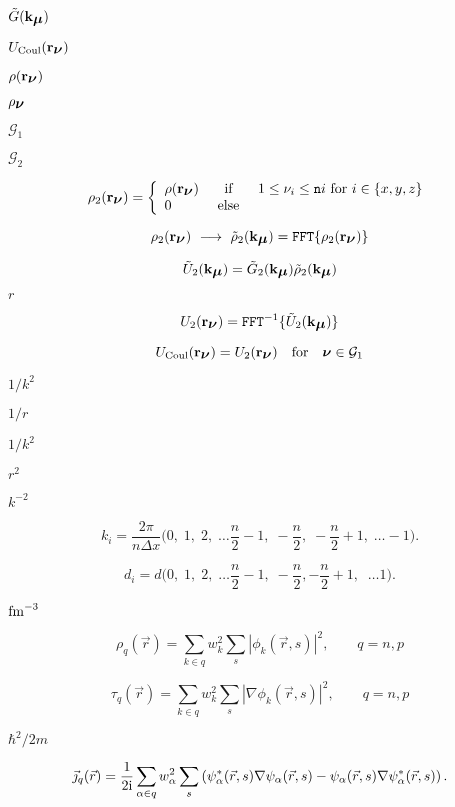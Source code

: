 \documentclass{article}
\begin{document}
$ \tilde{G}(\mathbf{k}_{\mbox{\boldmath$\mu$}}) $
\pagebreak

$ U_\mathrm{Coul}(\mathbf{r}_{\mbox{\boldmath$\nu$}}) $
\pagebreak

$\rho(\mathbf{r}_{\mbox{\boldmath$\nu$}})$
\pagebreak

$ \rho_{\mbox{\boldmath$\nu$}} $
\pagebreak

$ \mathcal{G}_1 $
\pagebreak

$ \mathcal{G}_2 $
\pagebreak

\[ \rho_2(\mathbf{r}_{\mbox{\boldmath$\nu$}}) = \left\{\begin{array}{lcl} \rho(\mathbf{r}_{\mbox{\boldmath$\nu$}}) &\mbox{ if }& 1\leq \nu_i \leq {\tt n}i \mbox{ for } i\in\{x,y,z\}\\ 0 &\mbox{ else }\end{array}\right. \]
\pagebreak

\[ \rho_2(\mathbf{r}_{\bnu})\ \longrightarrow\ \tilde{\rho}_2(\mathbf{k}_{\bmu})={\tt FFT}\{\rho_2(\mathbf{r}_{\bnu})\} \]
\pagebreak

\[ \tilde{U}_2(\mathbf{k}_{\mbox{\boldmath$\mu$}}) =\tilde{G}_2(\mathbf{k}_{\mbox{\boldmath$\mu$}})\tilde{\rho}_2(\mathbf{k}_{\mbox{\boldmath$\mu$}}) \]
\pagebreak

$ r $
\pagebreak

\[ {U}_2(\mathbf{r}_{\mbox{\boldmath$\nu$}})={\tt FFT}^{-1}\{\tilde{U}_2(\mathbf{k}_{\mbox{\boldmath$\mu$}})\} \]
\pagebreak

\[ {U}_\mathrm{Coul}(\mathbf{r}_{\mbox{\boldmath$\nu$}})=U_2(\mathbf{r}_{\mbox{\boldmath$\nu$}})\quad\mbox{for}\quad\mbox{\boldmath$\nu$}\in\mathcal{G}_1 \]
\pagebreak

$1/k^2$
\pagebreak

$1/r$
\pagebreak

$ 1/k^2 $
\pagebreak

$r^2$
\pagebreak

$k^{-2}$
\pagebreak

\[ k_i=\frac{2\pi}{n\Delta x}\bigl(0,\;1,\;2,\;\ldots \frac{n}2-1,\; -\frac{n}2,\;-\frac{n}2+1,\;\ldots -1\bigr).\]
\pagebreak

\[ d_i=d\bigl(0,\;1,\;2,\;\ldots \frac{n}2-1,\; -\frac{n}2,-\frac{n}2+1,\;\;\ldots 1\bigr).\]
\pagebreak

${\rm fm}^{-3} $
\pagebreak

\[ \rho_q(\vec r)=\sum_{k\in q}w_k^2\sum_s|\phi_k(\vec r,s)|^2,\qquad q=n,p \]
\pagebreak

\[ \tau_q(\vec r)=\sum_{k\in q}w_k^2\sum_s|\nabla\phi_k(\vec r,s)|^2, \qquad q=n,p\]
\pagebreak

$ \hbar^2/2m $
\pagebreak

\[ \vec\jmath_q(\vec r) = \frac{1}{2{\mathrm i}}\sum_{\alpha\in q}w_\alpha^2 \sum_s\left(\psi_\alpha^*(\vec r,s)\nabla\psi_\alpha(\vec r,s)-\psi_\alpha(\vec r,s) \nabla\psi_\alpha^*(\vec r,s)\right). \]
\pagebreak
\end{document}

